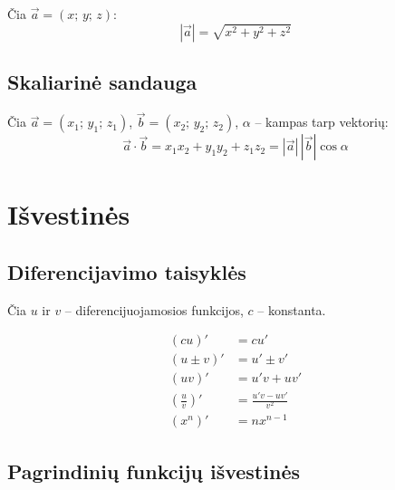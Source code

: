 Čia $\vec{a} = (x;\, y;\, z)$:
\[
|\vec{a}| = \sqrt{x^2 + y^2 + z^2}
\]

\subsection{Skaliarinė sandauga}

Čia $\vec{a} = (x_1;\, y_1;\, z_1)$, $\vec{b} = (x_2;\, y_2;\, z_2)$,
$\alpha$ – kampas tarp vektorių:
\[
\vec{a} \cdot \vec{b} = x_1 x_2 + y_1 y_2 + z_1 z_2 = |\vec{a}|\,|\vec{b}|\cos\alpha
\]

\section{Išvestinės}

\subsection{Diferencijavimo taisyklės}

Čia $u$ ir $v$ – diferencijuojamosios funkcijos, $c$ – konstanta.

\begin{tcolorbox}[colback=red!5!white, colframe=red!60!black, title=Diferencijavimo taisyklės]
\begin{align}
(cu)'           &= cu' \\[4pt]
(u \pm v)'      &= u' \pm v' \\[4pt]
(uv)'           &= u'v + uv' \\[4pt]
\left(\frac{u}{v}\right)' &= \frac{u'v - uv'}{v^2} \\[6pt]
(x^n)'          &= nx^{n-1}
\end{align}
\end{tcolorbox}

\subsection{Pagrindinių funkcijų išvestinės}

